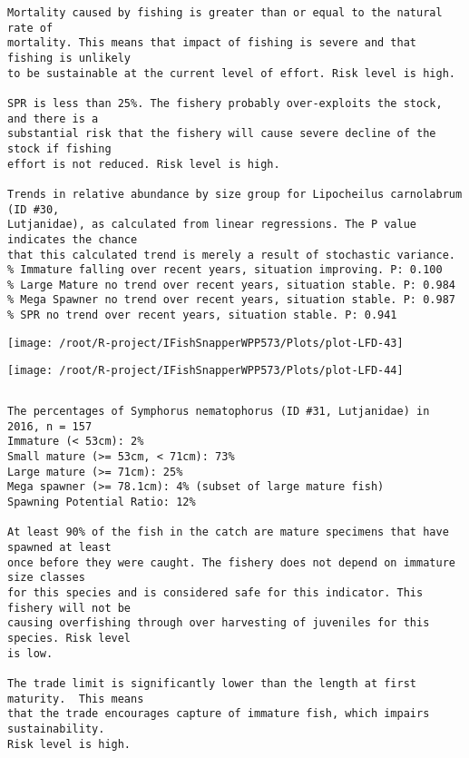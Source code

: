 \documentclass{report}\usepackage[]{graphicx}\usepackage[]{color}
\makeatletter
\def\maxwidth{ %
  \ifdim\Gin@nat@width>\linewidth
    \linewidth
  \else
    \Gin@nat@width
  \fi
}
\newenvironment{kframe}{%
 \def\at@end@of@kframe{}%
 \ifinner\ifhmode%
  \def\at@end@of@kframe{\end{minipage}}%
  \begin{minipage}{\columnwidth}%
 \fi\fi%
 \def\FrameCommand##1{\hskip\@totalleftmargin \hskip-\fboxsep
 \colorbox{shadecolor}{##1}\hskip-\fboxsep
     \hskip-\linewidth \hskip-\@totalleftmargin \hskip\columnwidth}%
 \MakeFramed {\advance\hsize-\width
   \@totalleftmargin\z@ \linewidth\hsize
   \@setminipage}}%
 {\par\unskip\endMakeFramed%
 \at@end@of@kframe}
\newenvironment{knitrout}{}{} %
\makeatother
\begin{document}
\begin{knitrout}
\begin{kframe}
\begin{verbatim}
Mortality caused by fishing is greater than or equal to the natural rate of
mortality. This means that impact of fishing is severe and that fishing is unlikely
to be sustainable at the current level of effort. Risk level is high.
 
SPR is less than 25%. The fishery probably over-exploits the stock, and there is a
substantial risk that the fishery will cause severe decline of the stock if fishing
effort is not reduced. Risk level is high.
 
Trends in relative abundance by size group for Lipocheilus carnolabrum (ID #30,
Lutjanidae), as calculated from linear regressions. The P value indicates the chance
that this calculated trend is merely a result of stochastic variance.
% Immature falling over recent years, situation improving. P: 0.100
% Large Mature no trend over recent years, situation stable. P: 0.984
% Mega Spawner no trend over recent years, situation stable. P: 0.987
% SPR no trend over recent years, situation stable. P: 0.941
\end{verbatim}
\end{kframe}
\texttt{[image: /root/R-project/IFishSnapperWPP573/Plots/plot-LFD-43]} 

\texttt{[image: /root/R-project/IFishSnapperWPP573/Plots/plot-LFD-44]} 
\begin{kframe}\begin{verbatim}
\end{verbatim}
\end{kframe}
\clearpage
\newpage
\begin{kframe}\begin{verbatim}The percentages of Symphorus nematophorus (ID #31, Lutjanidae) in 2016, n = 157
Immature (< 53cm): 2%
Small mature (>= 53cm, < 71cm): 73%
Large mature (>= 71cm): 25%
Mega spawner (>= 78.1cm): 4% (subset of large mature fish)
Spawning Potential Ratio: 12%
 
At least 90% of the fish in the catch are mature specimens that have spawned at least
once before they were caught. The fishery does not depend on immature size classes
for this species and is considered safe for this indicator. This fishery will not be
causing overfishing through over harvesting of juveniles for this species. Risk level
is low.

The trade limit is significantly lower than the length at first maturity.  This means
that the trade encourages capture of immature fish, which impairs sustainability.
Risk level is high.


\end{verbatim}
\end{kframe}
\end{knitrout}
\end{document}
